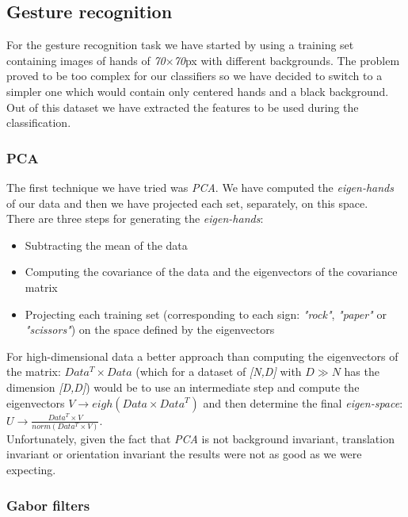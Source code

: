 \documentclass[a4paper, 11pt, twocolumn]{article}
\begin{document}
        \subsection{Gesture recognition}
		For the gesture recognition task we have started by using a training set containing images of hands of \emph{70$\times$70}px with different backgrounds. The problem proved to be too complex for our classifiers so we have decided to switch to a simpler one which would contain only centered hands and a black background.\\ 
		\hspace*{10px}Out of this dataset we have extracted the features to be used during the classification.
		\label{sec:Meth_clssifyHands}
		\subsubsection{PCA}
		The first technique we have tried was \emph{PCA}. We have computed the \emph{eigen-hands} of our data and then we have projected each set, separately, on this space.\\
		\hspace*{10px}There are three steps for generating the \emph{eigen-hands}:
		\begin{itemize}
		\item Subtracting the mean of the data
		\item Computing the covariance of the data and the eigenvectors of the covariance matrix
		\item Projecting each training set (corresponding to each sign: \emph{"rock"}, \emph{"paper"} or \emph{"scissors"}) on the space defined by the eigenvectors
		\end{itemize}
		\hspace*{10px}For high-dimensional data a better approach than computing the eigenvectors of the matrix: \emph{$Data^T \times Data$} (which for a dataset of \emph{[N,D]} with \emph{$D\gg N$} has the dimension \emph{[D,D]}) would be to use an intermediate step and compute the eigenvectors \emph{$V \rightarrow eigh(Data\times Data^T)$} and then determine the final \emph{eigen-space}: \emph{$U \rightarrow \frac{Data^T\times V}{norm(Data^T\times V)}$}.\\
		\hspace*{10px}Unfortunately, given the fact that \emph{PCA} is not background invariant, translation invariant or orientation invariant the results were not as good as we were expecting.	
		\subsubsection{Gabor filters}
		\begin{center} 
		\end{center}
\end{document}
